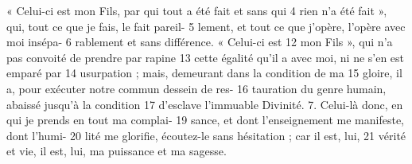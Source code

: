 « Celui-ci est mon Fils, par qui tout a été fait et sans qui	 
4	 	rien n'a été fait », qui, tout ce que je fais, le fait pareil-	 
5	 	lement, et tout ce que j'opère, l'opère avec moi insépa-	 
6	 	rablement et sans différence. 
« Celui-ci est	 
12	 	mon Fils », qui n'a pas convoité de prendre par rapine	 
13	 	cette égalité qu'il a avec moi, ni ne s'en est emparé par	 
14	 	usurpation ; mais, demeurant dans la condition de ma	 
15	 	gloire, il a, pour exécuter notre commun dessein de res-	 
16	 	tauration du genre humain, abaissé jusqu'à la condition	 
17	 	d'esclave l'immuable Divinité.
7. Celui-là donc, en qui je prends en tout ma complai-	 
19	 	sance, et dont l'enseignement me manifeste, dont l'humi-	 
20	 	lité me glorifie, écoutez-le sans hésitation ; car il est, lui,	 
21	 	vérité et vie, il est, lui, ma puissance et ma sagesse.